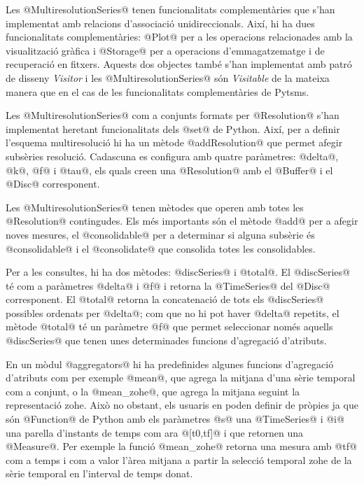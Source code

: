 Les @MultiresolutionSeries@ tenen funcionalitats complementàries
que s'han implementat amb relacions d'associació
unidireccionals. Així, hi ha dues funcionalitats complementàries:
@Plot@ per a les operacions relacionades amb la visualització
gràfica i @Storage@ per a operacions d'emmagatzematge i de
recuperació en fitxers. Aquests dos objectes també s'han implementat
amb patró de disseny \emph{Visitor} i les @MultiresolutionSeries@
són \emph{Visitable} de la mateixa manera que en el cas de les
funcionalitats complementàries de Pytsms.


Les @MultiresolutionSeries@ com a conjunts formats per
@Resolution@ s'han implementat heretant funcionalitats dels
@set@ de Python. Així, per a definir l'esquema multiresolució hi
ha un mètode @addResolution@ que permet afegir subsèries
resolució. Cadascuna es configura amb quatre paràmetres: @delta@,
@k@, @f@ i @tau@, els quals creen una @Resolution@
amb el @Buffer@ i el @Disc@ corresponent.

Les @MultiresolutionSeries@ tenen mètodes que operen amb totes les
@Resolution@ contingudes. Els més importants són el mètode @add@ per a
afegir noves mesures, el @consolidable@ per a determinar si alguna
subsèrie és @consolidable@ i el @consolidate@ que consolida totes les
consolidables.

Per a les consultes, hi ha dos mètodes: @discSeries@ i @total@. El
@discSeries@ té com a paràmetres @delta@ i @f@ i retorna la
@TimeSeries@ del @Disc@ corresponent. El @total@ retorna la
concatenació de tots els @discSeries@ possibles ordenats per @delta@;
com que no hi pot haver @delta@ repetits, el mètode @total@ té un
paràmetre @f@ que permet seleccionar només aquells @discSeries@ que
tenen unes determinades funcions d'agregació d'atributs.



En un mòdul @aggregators@ hi ha predefinides algunes funcions
d'agregació d'atributs com per exemple @mean@, que agrega la mitjana
d'una sèrie temporal com a conjunt, o la @mean_zohe@, que agrega la
mitjana seguint la representació \gls{zohe}.  Això no obstant, els usuaris
en poden definir de pròpies ja que són @Function@ de Python amb els
paràmetres @s@ una @TimeSeries@ i @i@ una parella d'instants de temps
com ara @[t0,tf]@ i que retornen una @Measure@. Per exemple la funció
@mean_zohe@ retorna una mesura amb @tf@ com a temps i com a valor
l'àrea mitjana a partir la selecció temporal \gls{zohe} de la sèrie temporal
en l'interval de temps donat.






